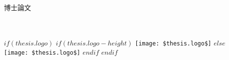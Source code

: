 \frontmatter %

\pagestyle{plain} %


\begin{titlepage}
\begin{center}

\vspace*{.06\textheight}
{\scshape\LARGE \univname\par}\vspace{1.5cm} %
\textsc{\LARGE 博士論文}\\[0.5cm] %

\HRule \\[0.3cm] %
{\huge \bfseries \ttitle\par}\vspace{0.4cm} %
\HRule \\[1.5cm] %

\vspace{0.1cm}  %
$if(thesis.logo)$
$if(thesis.logo-height)$
\texttt{[image: \$thesis.logo\$]} %
$else$
\texttt{[image: \$thesis.logo\$]}
$endif$
$endif$




\end{center}
\end{titlepage}

